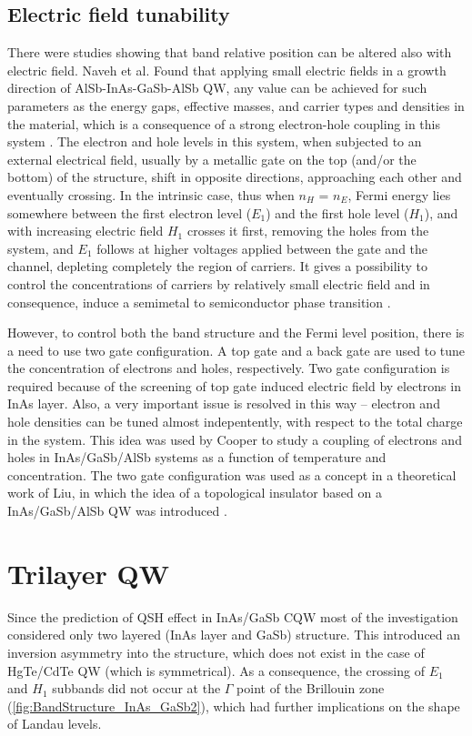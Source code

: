 \documentclass[titlepage,a4paper]{book}
\begin{document}
\subsection{Electric field tunability}
There were studies showing that band relative position can be altered also with electric field. Naveh et al. Found that applying small electric fields in a growth direction of AlSb-InAs-GaSb-AlSb QW, any value can be achieved for such parameters as the energy gaps, effective masses, and carrier types and densities in the material, which is a consequence of a strong electron-hole coupling in this system \cite{Naveh_ElectricField}. The electron and hole levels in this system, when subjected to an external electrical field, usually by a metallic gate on the top (and/or the bottom) of the structure, shift in opposite directions, approaching each other and eventually crossing. In the intrinsic case, thus when $n_H$ = $n_E$, Fermi energy lies somewhere between the first electron level ($E_1$) and the first hole level ($H_1$), and with increasing electric field $H_1$ crosses it first, removing the holes from the system, and $E_1$ follows at higher voltages applied between the gate and the channel, depleting completely the region of carriers. It gives a possibility to control the concentrations of carriers by relatively small electric field and in consequence, induce a semimetal to semiconductor phase transition \cite{Mendez_ElectricField}.

However, to control both the band structure and the Fermi level position, there is a need to use two gate configuration. A top gate and a back gate are used to tune the concentration of electrons and holes, respectively. Two gate configuration is required because of the screening of top gate induced electric field by electrons in InAs layer. Also, a very important issue is resolved in this way – electron and hole densities can be tuned almost indepentently, with respect to the total charge in the system. This idea was used by Cooper \cite{Cooper_ElectricField} to study a coupling of electrons and holes in InAs/GaSb/AlSb systems as a function of temperature and concentration. The two gate configuration was used as a concept in a theoretical work of Liu, in which the idea of a topological insulator based on a InAs/GaSb/AlSb QW was introduced \cite{Liu_Topology}.

\section{Trilayer QW}
Since the prediction of QSH effect in InAs/GaSb CQW most of the investigation considered only two layered (InAs layer and GaSb) structure. This introduced an inversion asymmetry into the structure, which does not exist in the case of HgTe/CdTe QW (which is symmetrical). As a consequence, the crossing of $E_1$ and $H_1$ subbands did not occur at the $\Gamma$ point of the Brillouin zone \cite{Murakami_Trilayer} (\ref{fig:BandStructure_InAs_GaSb2}), which had further implications on the shape of Landau levels.
\end{document}
